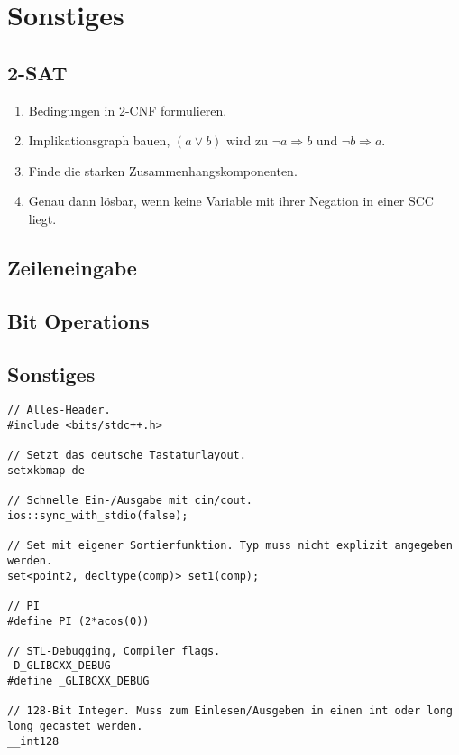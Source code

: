 \section{Sonstiges}

\subsection{2-SAT}
\begin{enumerate}
	\item Bedingungen in 2-CNF formulieren.
	\item Implikationsgraph bauen, $\left(a \vee b\right)$ wird zu $\neg a \Rightarrow b$ und $\neg b \Rightarrow a$.
	\item Finde die starken Zusammenhangskomponenten.
	\item Genau dann lösbar, wenn keine Variable mit ihrer Negation in einer SCC liegt.
\end{enumerate}

\subsection{Zeileneingabe}


\subsection{Bit Operations}


\subsection{Sonstiges}
\begin{lstlisting}
// Alles-Header.
#include <bits/stdc++.h>

// Setzt das deutsche Tastaturlayout.
setxkbmap de

// Schnelle Ein-/Ausgabe mit cin/cout.
ios::sync_with_stdio(false);

// Set mit eigener Sortierfunktion. Typ muss nicht explizit angegeben werden.
set<point2, decltype(comp)> set1(comp);

// PI
#define PI (2*acos(0))

// STL-Debugging, Compiler flags.
-D_GLIBCXX_DEBUG
#define _GLIBCXX_DEBUG

// 128-Bit Integer. Muss zum Einlesen/Ausgeben in einen int oder long long gecastet werden.
__int128
\end{lstlisting}

